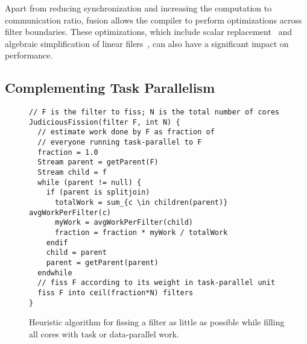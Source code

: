 Apart from reducing synchronization and increasing the computation to
communication ratio, fusion allows the compiler to perform
optimizations across filter boundaries.  These optimizations, which
include scalar replacement~\cite{sermulins05lctes} and algebraic
simplification of linear filers~\cite{lamb03pldi,agrawal05cases}, can
also have a significant impact on performance.




\subsection{Complementing Task Parallelism}

\begin{figure}[t]
\small
\begin{verbatim}
// F is the filter to fiss; N is the total number of cores
JudiciousFission(filter F, int N) {
  // estimate work done by F as fraction of 
  // everyone running task-parallel to F
  fraction = 1.0
  Stream parent = getParent(F)
  Stream child = f
  while (parent != null) {
    if (parent is splitjoin)
      totalWork = sum_{c \in children(parent)} avgWorkPerFilter(c)
      myWork = avgWorkPerFilter(child)
      fraction = fraction * myWork / totalWork
    endif
    child = parent
    parent = getParent(parent)
  endwhile
  // fiss F according to its weight in task-parallel unit
  fiss F into ceil(fraction*N) filters
}
\end{verbatim}
\caption{Heuristic algorithm for fissing a filter as little as
possible while filling all cores with task or data-parallel
work.\label{fig:judicious-fission}}
\end{figure}


